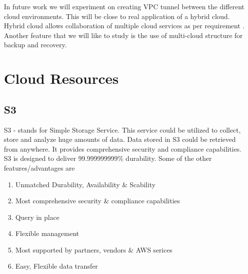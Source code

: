 \documentclass[journal]{hybrid-cloud}
\begin{document}
In future work  we will experiment on creating VPC tunnel between the different cloud environments. This will be close to real application of a hybrid cloud. Hybrid cloud allows collaboration of multiple cloud services as per requirement . Another feature that we will like to study is the use of multi-cloud structure for backup and recovery.



%


\appendices
\section{Cloud Resources}

\subsection{S3}

S3 - stands for Simple Storage Service. This service could be utilized to collect, store and analyze huge amounts of data. Data stored in S3 could be retrieved from anywhere. It provides comprehensive security and compliance capabilities. S3 is designed to deliver 99.999999999\% durability. Some of the other features/advantages are \cite{S3documentation}

\begin{enumerate}
	\item Unmatched Durability, Availability \& Scability
	\item Most comprehensive security \& compliance capabilities
	\item Query in place
	\item Flexible management
	\item Most supported by partners, vendors \& AWS serices
	\item Easy, Flexible data transfer
\end{enumerate}
\end{document}
